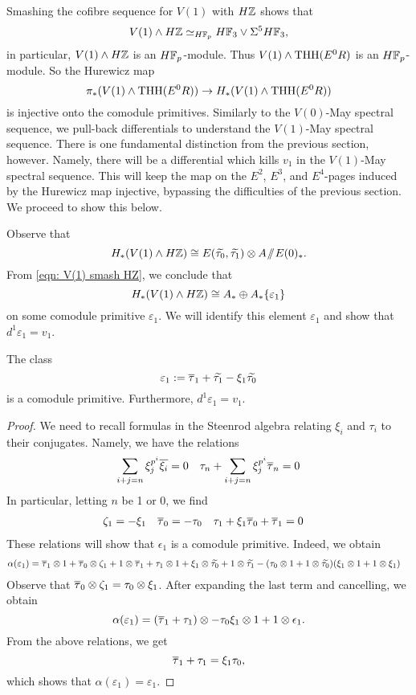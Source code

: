 Smashing the cofibre sequence for $V(1)$ with $H\mathbb{Z}$ shows that 
\begin{equation}\label{eqn: V(1) smash HZ}
V(1)\wedge H\mathbb{Z}\simeq_{H\mathbb{F}_p} H\mathbb{F}_3\vee \Sigma^5 H\mathbb{F}_3,
\end{equation}
in particular, $V(1)\wedge H\mathbb{Z}$ is an $H\mathbb{F}_p$-module. Thus $V(1)\wedge \operatorname{THH}(E^0R)$ is an $H\mathbb{F}_p$-module. So the Hurewicz map
\[
\pi_*(V(1)\wedge \operatorname{THH}(E^0R))\to H_*(V(1)\wedge \operatorname{THH}(E^0R))
\]
is injective onto the comodule primitives. Similarly to the $V(0)$-May spectral sequence, we pull-back differentials to understand the $V(1)$-May spectral sequence. There is one fundamental distinction from the previous section, however. Namely, there will be a differential which kills $v_1$ in the $V(1)$-May spectral sequence. This will keep the map on the $E^2$, $E^3$, and $E^4$-pages induced by the Hurewicz map injective, bypassing the difficulties of the previous section. We proceed to show this below. 

Observe that 
\[
H_*(V(1)\wedge H\mathbb{Z})\cong E(\widetilde{\tau_0}, \widetilde{\tau_1})\otimes A\! \sslash \! E(0)_*.
\]
From \eqref{eqn: V(1) smash HZ}, we conclude that 
\[
H_*(V(1)\wedge H\mathbb{Z})\cong A_*\oplus A_*\{\varepsilon_1\}
\] 
on some comodule primitive $\varepsilon_1$. We will identify this element $\varepsilon_1$ and show that $d^1\varepsilon_1=v_1$. 

\begin{prop}
	The class
	\[
	\varepsilon_1:= \overline{\tau}_1+\widetilde{\tau_1}-\xi_1\widetilde{\tau_0}
	\]
	is a comodule primitive. Furthermore, $d^1\varepsilon_1 = v_1$.
\end{prop}
\begin{proof}
	We need to recall formulas in the Steenrod algebra relating $\xi_i$ and $\tau_i$ to their conjugates. Namely, we have the relations
	\begin{align*}
		\sum_{i+j=n}\xi_j^{p^i}\overline{\xi_i}=0 & & \tau_n+\sum_{i+j=n}\xi_j^{p^i}\overline{\tau}_n =0
	\end{align*}
	In particular, letting $n$ be 1 or 0, we find 
	\begin{align*}
		\zeta_1 &= -\xi_1 & \overline{\tau}_0&=-\tau_0  &\tau_1+\xi_1\overline{\tau}_0+\overline{\tau}_1 &= 0
	\end{align*}
	These relations will show that $\epsilon_1$ is a comodule primitive. Indeed, we obtain
	\begin{align*}
		\alpha(\varepsilon_1) &= \overline{\tau}_1\otimes 1 + \overline{\tau}_0\otimes \zeta_1+1\otimes \overline{\tau}_1+\tau_1\otimes 1+\xi_1\otimes\widetilde{\tau_0}+1\otimes \widetilde{\tau_1} - (\tau_0\otimes 1+1\otimes \widetilde{\tau_0})(\xi_1\otimes 1+1\otimes \xi_1)
	\end{align*}
	Observe that $\overline{\tau}_0\otimes \zeta_1 = \tau_0\otimes \xi_1$. After expanding the last term and cancelling, we obtain
	\[
	\alpha(\varepsilon_1) = (\overline{\tau}_1+\tau_1)\otimes -\tau_0\xi_1\otimes 1+1\otimes \epsilon_1.
	\]
	From the above relations, we get
	\[
	\overline{\tau}_1+\tau_1 = \xi_1\tau_0,
	\]
	which shows that $\alpha(\varepsilon_1) = \varepsilon_1$.
\end{proof}

